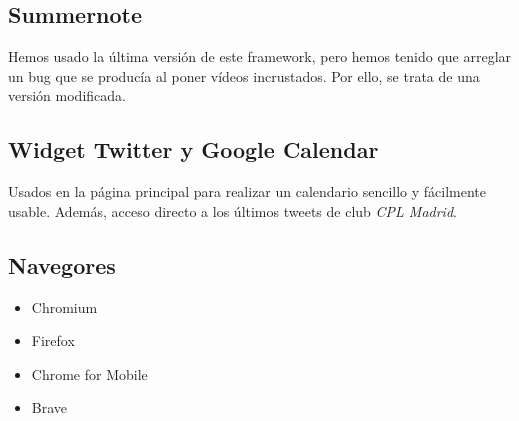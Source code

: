 \documentclass[10pt, spanish, pdftex]{template/UC3M_document}
\begin{document}
\subsection{Summernote}
Hemos usado la última versión de este framework, pero hemos tenido que arreglar un bug que se producía al poner vídeos incrustados. Por ello, se trata de una versión modificada.
\subsection{Widget Twitter y Google Calendar}
Usados en la página principal para realizar un calendario sencillo y fácilmente usable. Además, acceso directo a los últimos tweets de club \textit{CPL Madrid}.
\subsection{Navegores}
\begin{itemize}
  \item Chromium
  \item Firefox
  \item Chrome for Mobile
  \item Brave
\end{itemize}

\newpage
\end{document}
